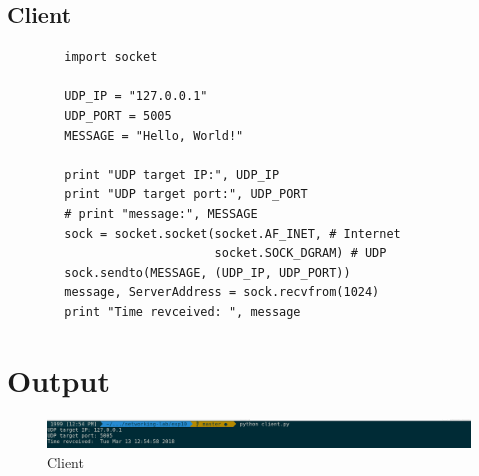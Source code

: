 \documentclass[a4paper,12pt]{article}
\begin{document}
    \subsection{Client}
    \begin{verbatim}
        import socket

        UDP_IP = "127.0.0.1"
        UDP_PORT = 5005
        MESSAGE = "Hello, World!"
        
        print "UDP target IP:", UDP_IP
        print "UDP target port:", UDP_PORT
        # print "message:", MESSAGE
        sock = socket.socket(socket.AF_INET, # Internet
                             socket.SOCK_DGRAM) # UDP
        sock.sendto(MESSAGE, (UDP_IP, UDP_PORT))
        message, ServerAddress = sock.recvfrom(1024)
        print "Time revceived: ", message        
    \end{verbatim}
    \section{Output}
    \pagebreak
    
    \begin{figure}
        \includegraphics[width=\linewidth]{./timeserver.png}
        \caption{Client}
        \label{fig:client}
    \end{figure}

    
    
    
\end{document}
